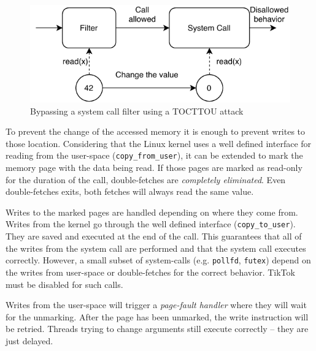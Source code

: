 \begin{figure}[]
  \centering
  \includegraphics[width=.85\linewidth]{img/tocttou.pdf}
  \caption{Bypassing a system call filter using a TOCTTOU attack}
  \label{fig:tocttou}
\end{figure}


To prevent the change of the accessed memory it is enough to prevent writes to
those location. Considering that the Linux kernel uses a well defined interface
for reading from the user-space (\texttt{copy\_from\_user}), it can be extended
to mark the memory page with the data being read. If those pages are marked as
read-only for the duration of the call, double-fetches are \emph{completely
eliminated}. Even double-fetches exits, both fetches will always read the same
value.


Writes to the marked pages are handled depending on where they come from. Writes
from the kernel go through the well defined interface (\texttt{copy\_to\_user}).
They are saved and executed at the end of the call. This guarantees that all of
the writes from the system call are performed and that the system call executes
correctly. However, a small subset of system-calls (e.g. \texttt{pollfd},
\texttt{futex}) depend on the writes from user-space or double-fetches for the
correct behavior. TikTok must be disabled for such calls.

Writes from the user-space will trigger a \emph{page-fault handler} where they
will wait for the unmarking. After the page has been unmarked, the write
instruction will be retried. Threads trying to change arguments still execute
correctly -- they are just delayed.


